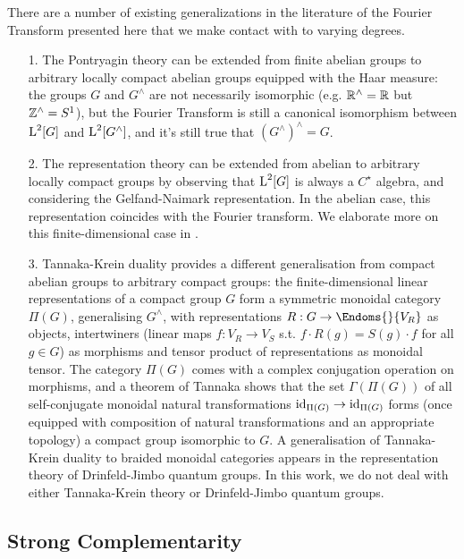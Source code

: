 There are a number of existing generalizations in the literature of the Fourier Transform presented here that we make contact with to varying degrees. 
\begin{enumerate}
\item[1.] The Pontryagin theory can be extended from finite abelian groups to arbitrary locally compact abelian groups equipped with the Haar measure: the groups $G$ and $G^\wedge$ are not necessarily isomorphic (e.g. $\mathbb{R}^\wedge = \mathbb{R}$ but $\mathbb{Z}^\wedge = S^1$), but the Fourier Transform is still a canonical isomorphism between $\operatorname{L}^2[G]$ and $\operatorname{L}^2[G^\wedge]$, and it's still true that $(G^\wedge)^\wedge = G$. 

\item[2.] The representation theory can be extended from abelian to arbitrary locally compact groups by observing that $\operatorname{L}^2[G]$ is always a $C^\star$ algebra, and considering the Gelfand-Naimark representation. In the abelian case, this representation coincides with the Fourier transform. We elaborate more on this finite-dimensional case in . 

\item[3.] Tannaka-Krein duality provides a different generalisation from compact abelian groups to arbitrary compact groups: the finite-dimensional linear representations of a compact group $G$ form a symmetric monoidal category $\Pi(G)$, generalising $G^\wedge$, with representations $R:G \rightarrow \Endoms{}{V_R}$ as objects, intertwiners (linear maps $f: V_R \rightarrow V_S$ s.t. $f \cdot R(g) = S(g) \cdot f$ for all $g\in G$) as morphisms and tensor product of representations as monoidal tensor. The category $\Pi(G)$ comes with a complex conjugation operation on morphisms, and a theorem of Tannaka shows that the set $\Gamma(\Pi(G))$ of all self-conjugate monoidal natural transformations $\mbox{id}_{\Pi(G)} \rightarrow \mbox{id}_{\Pi(G)}$ forms (once equipped with composition of natural transformations and an appropriate topology) a compact group isomorphic to $G$. A generalisation of Tannaka-Krein duality to braided monoidal categories appears in the representation theory of Drinfeld-Jimbo quantum groups. In this work, we do not deal with either Tannaka-Krein theory or Drinfeld-Jimbo quantum groups.
\end{enumerate}

\subsection{Strong Complementarity}
\label{sec:strcompl}

